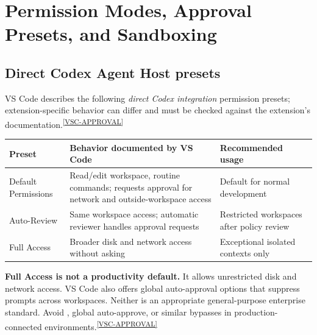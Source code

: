 \documentclass[11pt,letterpaper,oneside]{article}
\newcommand{\cmd}[1]{\path{#1}}
\newcommand{\src}[1]{\textsuperscript{\hyperref[ref:#1]{[#1]}}}
\begin{document}
\section{Permission Modes, Approval Presets, and Sandboxing}
\subsection{Direct Codex Agent Host presets}
VS Code describes the following \emph{direct Codex integration} permission presets; extension-specific behavior can differ and must be checked against the extension's documentation.\src{VSC-APPROVAL}
\begin{table}[htbp]
\small
\centering
\begin{tabularx}{\linewidth}{@{}>{\raggedright\arraybackslash}p{2.8cm}Y >{\raggedright\arraybackslash}p{3.3cm}@{}}
\toprule
\textbf{Preset} & \textbf{Behavior documented by VS Code} & \textbf{Recommended usage}\tabularnewline\midrule
Default Permissions & Read/edit workspace, routine commands; requests approval for network and outside-workspace access & Default for normal development\\
Auto-Review & Same workspace access; automatic reviewer handles approval requests & Restricted workspaces after policy review\\
Full Access & Broader disk and network access without asking & Exceptional isolated contexts only\\
\bottomrule
\end{tabularx}
\end{table}

\begin{riskbox}
\textbf{Full Access is not a productivity default.} It allows unrestricted disk and network access. VS Code also offers global auto-approval options that suppress prompts across workspaces. Neither is an appropriate general-purpose enterprise standard. Avoid \cmd{/yolo}, global auto-approve, or similar bypasses in production-connected environments.\src{VSC-APPROVAL}
\end{riskbox}
\end{document}
